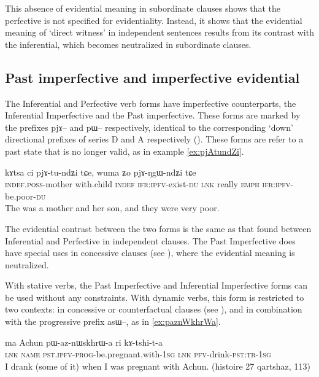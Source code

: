 \documentclass[oldfontcommands,oneside,a4paper,11pt]{article}
\newcommand{\ipa}[1]{{\phon \mbox{#1}}} %
\begin{document}
This absence of evidential meaning in subordinate clauses shows that the perfective is not specified for evidentiality. Instead, it shows that the evidential meaning of `direct witness' in independent sentences results from its contrast with the inferential, which becomes neutralized in subordinate clauses.


\subsection{Past imperfective and imperfective evidential}  \label{sec:pst:ipfv}
The Inferential and Perfective verb forms have imperfective counterparts, the Inferential Imperfective and the  Past imperfective. These forms are marked by the prefixes \ipa{pjɤ--} and \ipa{pɯ--} respectively, identical to the 
corresponding `down' directional prefixes of series D and A respectively (\citealt{lin11direction}). These forms are refer to a past state that is no longer valid, as in example \ref{ex:pjAtundZi}. 

\begin{exe}
\ex \label{ex:pjAtundZi}
\gll  \ipa{tɤ-mu} 	\ipa{kɤtsa} 	\ipa{ci} 	\ipa{pjɤ-tu-ndʑi} 	\ipa{tɕe,} 	\ipa{wuma} 	\ipa{ʑo} 	\ipa{pjɤ-ŋgɯ-ndʑi} 	\ipa{tɕe}  \\
\textsc{indef.poss}-mother with.child \textsc{indef} \textsc{ifr:ipfv}-exist-\textsc{du} \textsc{lnk} really \textsc{emph}  \textsc{ifr:ipfv}-be.poor-\textsc{du} \\
\glt The was a mother and her son, and they were very poor.
\end{exe}

The evidential contrast between the two forms is the same as that found between Inferential and Perfective in independent clauses. The Past Imperfective does have special uses in concessive clauses (see \citealt[298]{jacques14linking}), where the evidential meaning is neutralized.

With stative verbs, the Past Imperfective and Inferential Imperfective forms can be used without any constraints. With dynamic verbs, this form is restricted to two contexts: in concessive or counterfactual clauses (see \citealt[298]{jacques14linking}), and in combination with the progressive prefix \ipa{asɯ--}, as in \ref{ex:paznWkhrWa}.

\begin{exe}
\ex \label{ex:paznWkhrWa}
\gll 
\ipa{ma} 	Achun 	\ipa{pɯ-az-nɯskhrɯ-a} 	\ipa{ri} 	\ipa{kɤ-tshi-t-a} \\
\textsc{lnk} \textsc{name} \textsc{pst.ipfv-prog}-be.pregnant.with-\textsc{1sg} \textsc{lnk} \textsc{pfv}-drink-\textsc{pst:tr-1sg} \\
\glt I drank (some of it) when I was pregnant with Achun. (histoire 27 qartshaz, 113)
\end{exe}
\end{document}
